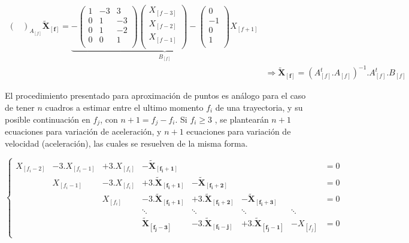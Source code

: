 \begin{equation}
\begin{split}
{\begin{pmatrix}
\end{pmatrix}
}_{A_{[f]}}\boldsymbol{\tilde{X}_{[f]}} = \underbrace{- \begin{pmatrix}
1 &-3 &3\\
0 &1 &-3\\
0 &1 &-2\\
0 &0 &1\\
\end{pmatrix}
\begin{pmatrix}
X_{[f-3]}\\
X_{[f-2]}\\
X_{[f-1]}\\
\end{pmatrix} - \begin{pmatrix}
0\\
-1\\
0\\
1\\
\end{pmatrix}
X_{[f+1]}}_{B_{[f]}} \\
&\Rightarrow \boldsymbol{\tilde{X}_{[f]}} = \left( A_{[f]}^{t}.A_{[f]}\right)^{-1}.A_{[f]}^{t}.B_{[f]}
\end{split}
\label{matrices_estimacion_01}
\end{equation}

El procedimiento presentado para aproximación de puntos es análogo para el caso de tener $n$ cuadros a estimar entre el ultimo momento $f_{i}$ de una trayectoria, y su posible continuación en $f_{j}$, con $n+1=f_{j}-f_{i}$. Si $f_{i} \geq 3$ , se plantearán $n+1$ ecuaciones para variación de aceleración, y $n+1$ ecuaciones para variación de velocidad (aceleración), las cuales se resuelven de la misma forma. 

\begin{equation}
\left\{
\begin{matrix}
X_{[f_{i}-2]} &-3.X_{[f_{i}-1]} &+3.X_{[f_{i}]} &-\boldsymbol{\tilde{X}_{[f_{i}+1]}} & & & &=0 \\
& X_{[f_{i}-1]} &-3.X_{[f_{i}]} &+3.\boldsymbol{\tilde{X}_{[f_{i}+1]}} &-\boldsymbol{\tilde{X}_{[f_{i}+2]}} & & &=0 \\
& & X_{[f_{i}]} &-3.\boldsymbol{\tilde{X}_{[f_{i}+1]}} &+3.\boldsymbol{\tilde{X}_{[f_{i}+2]}} &-\boldsymbol{\tilde{X}_{[f_{i}+3]}}& &=0 \\
& & & \ddots & \ddots & \ddots & \ddots & \\
& & & \boldsymbol{\tilde{X}_{[f_{j}-3]}} &-3.\boldsymbol{\tilde{X}_{[f_{i}-j]}} &+3.\boldsymbol{\tilde{X}_{[f_{j}-1]}} &-X_{[f_{j}]} &=0 \\
\end{matrix}
\right.
\label{ecuaciones_estimacion_n}
\end{equation}


